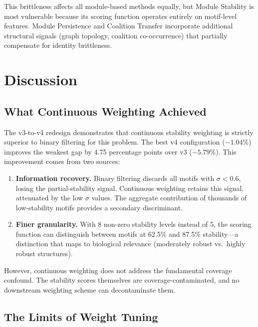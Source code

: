 \documentclass{../yalumba}
\begin{document}
This brittleness affects all module-based methods equally, but Module Stability
is most vulnerable because its scoring function operates entirely on motif-level
features.  Module Persistence and Coalition Transfer incorporate additional
structural signals (graph topology, coalition co-occurrence) that partially
compensate for identity brittleness.


\section{Discussion}
\label{sec:discussion}

\subsection{What Continuous Weighting Achieved}

The v3-to-v4 redesign demonstrates that continuous stability weighting is
strictly superior to binary filtering for this problem.  The best v4
configuration ($-1.04\%$) improves the weakest gap by 4.75 percentage points
over v3 ($-5.79\%$).  This improvement comes from two sources:

\begin{enumerate}
  \item \textbf{Information recovery.}  Binary filtering discards all motifs
    with $\sigma < 0.6$, losing the partial-stability signal.  Continuous
    weighting retains this signal, attenuated by the low $\sigma$ values.
    The aggregate contribution of thousands of low-stability motifs provides
    a secondary discriminant.
  \item \textbf{Finer granularity.}  With 8 non-zero stability levels instead
    of 5, the scoring function can distinguish between motifs at 62.5\% and
    87.5\% stability---a distinction that maps to biological relevance
    (moderately robust vs.\ highly robust structures).
\end{enumerate}


However, continuous weighting does not address the fundamental coverage
confound.  The stability scores themselves are coverage-contaminated, and no
downstream weighting scheme can decontaminate them.

\subsection{The Limits of Weight Tuning}
\end{document}
